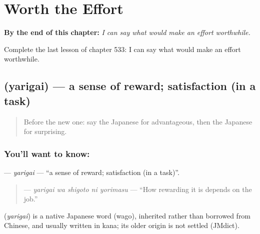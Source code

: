 
\chapter{Worth the Effort}
\label{ch:ja-worth-the-effort}

\begin{chapteropening}
\textbf{By the end of this chapter:} \emph{I can say what would make an effort worthwhile.}

Complete the last lesson of chapter 533: I can say what would make an effort worthwhile.
\end{chapteropening}

\section[\texorpdfstring{\ja{やりがい} (yarigai)}{やりがい (yarigai)}]{ (yarigai) — a sense of reward; satisfaction (in a task)}

\label{lesson:JA-C533-yarigai}



\begin{quote}
Before the new one: say the Japanese for advantageous, then the Japanese for surprising.
\end{quote}

\subsection*{You'll want to know: }
\textbf{} — \emph{yarigai} — \textquotedblleft{}a sense of reward; satisfaction (in a task)\textquotedblright{}.

\begin{quote}
\textbf{  } — \emph{yarigai wa shigoto ni yorimasu} — \textquotedblleft{}How rewarding it is depends on the job.\textquotedblright{}
\end{quote}

\begin{cousinweb}
\textbf{} (\emph{yarigai}) is a native Japanese word (wago), inherited rather than borrowed from Chinese, and usually written in kana; its older origin is not settled (JMdict).
\end{cousinweb}

